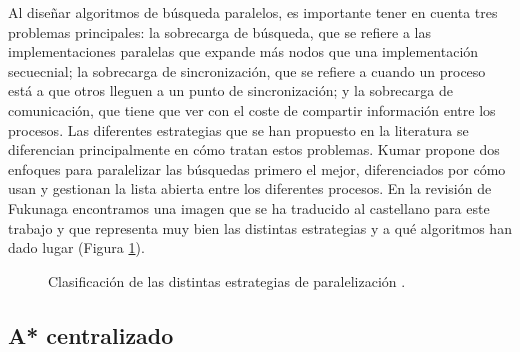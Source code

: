 \documentclass[a4paper,12pt]{article}
\begin{document}
Al diseñar algoritmos de búsqueda paralelos, es importante tener en cuenta tres problemas principales: la sobrecarga de búsqueda, que se refiere a las implementaciones paralelas que expande más nodos que una implementación secuecnial; la sobrecarga de sincronización, que se refiere a cuando un proceso está a que otros lleguen a un punto de sincronización; y la sobrecarga de comunicación, que tiene que ver con el coste de compartir información entre los procesos. Las diferentes estrategias que se han propuesto en la literatura se diferencian principalmente en cómo tratan estos problemas. Kumar \cite{kumar1988parallel} propone dos enfoques para paralelizar las búsquedas primero el mejor, diferenciados por cómo usan y gestionan la lista abierta entre los diferentes procesos. En la revisión de Fukunaga \cite{fukunaga2017survey} encontramos una imagen que se ha traducido al castellano para este trabajo y que representa muy bien las distintas estrategias y a qué algoritmos han dado lugar (Figura \ref{fig:clasficiacion}).

\begin{figure}[H]
    \centering
    
    \caption{Clasificación de las distintas estrategias de paralelización \cite{fukunaga2017survey}.}
    \label{fig:clasficiacion}
\end{figure}


\subsection{A* centralizado} \label{sec:centralizado}
\end{document}
